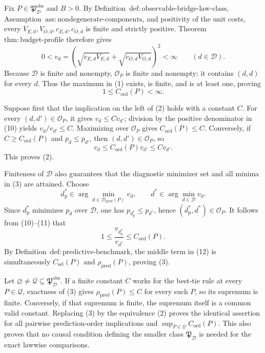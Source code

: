Fix \(P\in\mathfrak P_{\mathcal D}^{\mathrm{obs}}\) and \(B>0\).  By Definition~\(\mathrm{def{:}observable\text{-}bridge\text{-}law\text{-}class}\), Assumption~\(\mathrm{ass{:}nondegenerate\text{-}components}\), and positivity of the unit costs, every \(V_{E,d},V_{O,d},c_{E,d},c_{O,d}\) is finite and strictly positive.  Theorem~\(\mathrm{thm{:}budget\text{-}profile}\) therefore gives
\[
 0<v_d
 =\left(\sqrt{c_{E,d}V_{E,d}}+
          \sqrt{c_{O,d}V_{O,d}}\right)^2
 <\infty
 \qquad(d\in\mathcal D).                                      \tag{10}
\]
Because \(\mathcal D\) is finite and nonempty, \(\mathcal O_P\) is finite and nonempty: it contains \((d,d)\) for every \(d\).  Thus the maximum in (1) exists, is finite, and is at least one, proving
\[
 1\le C_{\mathrm{ord}}(P)<\infty.                             \tag{11}
\]

Suppose first that the implication on the left of (2) holds with a constant \(C\).  For every \((d,d')\in\mathcal O_P\), it gives \(v_d\le Cv_{d'}\); division by the positive denominator in (10) yields \(v_d/v_{d'}\le C\).  Maximizing over \(\mathcal O_P\) gives \(C_{\mathrm{ord}}(P)\le C\).  Conversely, if \(C\ge C_{\mathrm{ord}}(P)\) and \(p_d\le p_{d'}\), then \((d,d')\in\mathcal O_P\), so
\[
 v_d\le C_{\mathrm{ord}}(P)v_{d'}\le Cv_{d'}.
\]
This proves (2).

Finiteness of \(\mathcal D\) also guarantees that the diagnostic minimizer set and all minima in (3) are attained.  Choose
\[
 d_{\mathrm p}^*\in
 \arg\min_{d\in\mathcal D_{\mathrm{pred}}(P)}v_d,
 \qquad
 d^*\in\arg\min_{d\in\mathcal D}v_d.
\]
Since \(d_{\mathrm p}^*\) minimizes \(p_d\) over \(\mathcal D\), one has \(p_{d_{\mathrm p}^*}\le p_{d^*}\), hence \((d_{\mathrm p}^*,d^*)\in\mathcal O_P\).  It follows from (10)--(11) that
\[
 1\le
 \frac{v_{d_{\mathrm p}^*}}{v_{d^*}}
 \le C_{\mathrm{ord}}(P).                                    \tag{12}
\]
By Definition~\(\mathrm{def{:}predictive\text{-}benchmark}\), the middle term in (12) is simultaneously \(C_{\mathrm{sel}}(P)\) and \(\rho_{\mathrm{pred}}(P)\), proving (3).

Let \(\varnothing\ne\mathcal Q\subseteq\mathfrak P_{\mathcal D}^{\mathrm{obs}}\).  If a finite constant \(C\) works for the best-tie rule at every \(P\in\mathcal Q\), exactness of (3) gives \(\rho_{\mathrm{pred}}(P)\le C\) for every such \(P\), so its supremum is finite.  Conversely, if that supremum is finite, the supremum itself is a common valid constant.  Replacing (3) by the equivalence (2) proves the identical assertion for all pairwise prediction-order implications and \(\sup_{P\in\mathcal Q}C_{\mathrm{ord}}(P)\).  This also proves that no causal condition defining the smaller class \(\mathfrak P_{\mathcal D}\) is needed for the exact lawwise comparisons.

